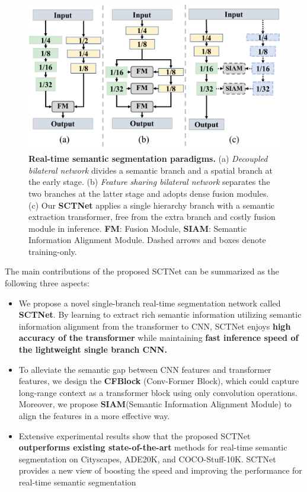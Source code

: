 \documentclass[letterpaper]{article} %
\begin{document}
\begin{figure}
  \begin{center}
     \includegraphics[width=\linewidth]{image/figure2_comparsion.pdf}
  \setlength{\belowdisplayskip}{-10pt}
  \end{center}
     \caption{\textbf{Real-time semantic segmentation paradigms.} (a) \emph{Decoupled bilateral network} divides a semantic branch and a spatial branch at the early stage. (b) \emph{Feature sharing bilateral network} separates the two branches at the latter stage and adopts dense fusion modules. (c) Our \textbf{SCTNet} applies a single hierarchy branch with a semantic extraction transformer, free from the extra branch and costly fusion module in inference. \textbf{FM}: Fusion Module,  \textbf{SIAM}: Semantic Information Alignment Module. Dashed arrows and boxes denote training-only. }
  \label{fig:figure2_comparsion}
  \end{figure}

The main contributions of the proposed SCTNet can be summarized as the following three aspects:
\begin{itemize}
    \item We propose a novel single-branch real-time segmentation network called \textbf{SCTNet}. By learning to extract rich semantic information utilizing semantic information alignment from the transformer to CNN, SCTNet enjoys \textbf{high accuracy of the transformer} while maintaining \textbf{fast inference speed of the lightweight single branch CNN.}
    \item To alleviate the semantic gap between CNN features and transformer features, we design the \textbf{CFBlock} (Conv-Former Block), which could capture long-range context as a transformer block using only convolution operations. Moreover, we propose \textbf{SIAM}(Semantic Information Alignment Module) to align the features in a more effective way.
    \item Extensive experimental results show that the proposed SCTNet \textbf{outperforms existing state-of-the-art} methods for real-time semantic segmentation on Cityscapes, ADE20K, and COCO-Stuff-10K. SCTNet provides a new view of boosting the speed and improving the performance for real-time semantic segmentation
\end{itemize}
\end{document}
